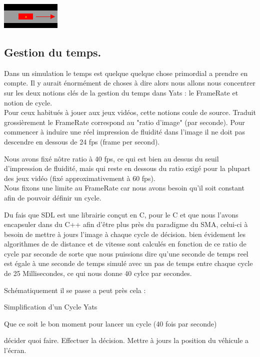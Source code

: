 \documentclass[a4paper,11pt]{article}
\begin{document}
\includegraphics[scale=1]{imgClasse/vehicle.png} 


\subsection{Gestion du temps.}

Dans un simulation le temps est quelque quelque chose primordial a prendre en compte. Il y aurait énormément de choses à dire alors nous allons nous concentrer sur les deux notions clés de la gestion du temps dans Yats : le FrameRate et notion de cycle.\\

Pour ceux habitués à jouer aux jeux vidéos, cette notions coule de source. Traduit grossièrement le FrameRate correspond au "ratio d'image" (par seconde). Pour commencer à induire une réel impression de fluidité dans l'image il ne doit pas descendre en dessous de 24 fps (frame per second). 

Nous avons fixé nôtre ratio à 40 fps, ce qui est bien au dessus du seuil d'impression de fluidité, mais qui reste en dessous du ratio exigé pour la plupart des jeux vidéo (fixé approximativement à 60 fps).\\

Nous fixons une limite au FrameRate car nous avons besoin qu'il soit constant afin de pouvoir définir un cycle.

Du fais que SDL est une librairie conçut en C, pour le C et que nous l'avons encapsuler dans du C++ afin d'être plus près du paradigme du SMA, celui-ci à besoin de mettre à jours l'image à chaque cycle de décision. bien évidement les algorithmes de de distance et de vitesse sont calculés en fonction de ce ratio de cycle par seconde de sorte que nous puissions dire qu'une seconde de temps reel est égale à une seconde de temps simulé avec un pas de temps entre chaque cycle de 25 Millisecondes, ce qui nous donne 40 cylce par secondes. 

Schématiquement il se passe a peut près cela :

\begin{algorithm}
\caption{Simplification d'un Cycle Yats}
\begin{algorithmic}

\REQUIRE Que ce soit le bon moment pour lancer un cycle (40 fois par seconde)

\STATE décider quoi faire.
\STATE Effectuer la décision.
\STATE Mettre à jours la position du véhicule a l'écran.
\ENDFOR

\end{algorithmic}
\end{algorithm}
\end{document}
